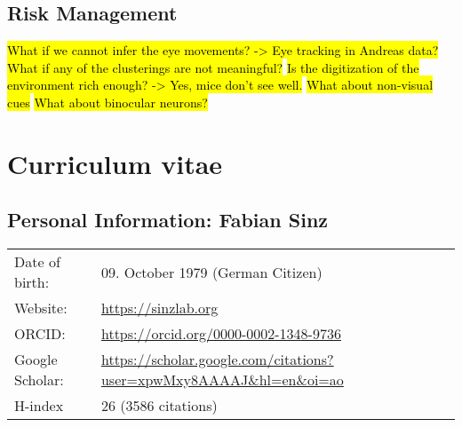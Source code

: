 \documentclass[COG,11pt]{ercgrant}
\begin{document}
\subsection{Risk Management}
\hl{What if we cannot infer the eye movements? -> Eye tracking in Andreas data?}
\hl{What if any of the clusterings are not meaningful?}
\hl{Is the digitization of the environment rich enough? -> Yes, mice don't see well. }
\hl{What about non-visual cues}
\hl{What about binocular neurons?}
\begin{small}
\printbibliography
\end{small}

% 	
% 	

\newpage
\section{Curriculum vitae}

\subsection{Personal Information: Fabian Sinz}
\begin{tabular}{p{3cm}l}
	Date of birth:         & 09. October 1979 (German Citizen)     \\
	Website:               & \url{https://sinzlab.org}     \\
	ORCID:                 &  \url{https://orcid.org/0000-0002-1348-9736}      \\
        Google Scholar:         & \url{https://scholar.google.com/citations?user=xpwMxy8AAAAJ&hl=en&oi=ao}\\
        H-index  & 26 (3586 citations)
\end{tabular}
\end{document}
